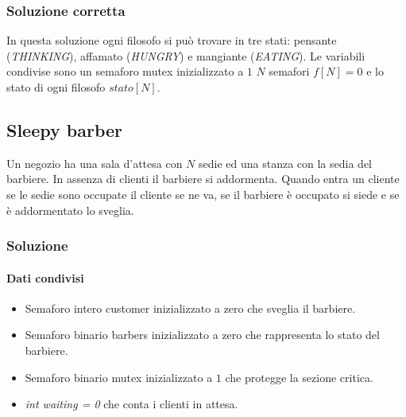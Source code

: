 \subsubsection{Soluzione corretta}
In questa soluzione ogni filosofo si pu\`o trovare in tre stati: pensante (\emph{THINKING}), affamato (\emph{HUNGRY}) e  mangiante (\emph{EATING}). Le variabili condivise sono un 
semaforo mutex inizializzato a $1$ $N$ semafori $f[N] = 0$ e lo stato di ogni filosofo $stato[N]$. 
\begin{multicols}{2}
	
	
	\columnbreak	
	
	
\end{multicols}
\subsection{Sleepy barber}
Un negozio ha una sala d'attesa con $N$ sedie ed una stanza con la sedia del barbiere. In assenza di clienti il barbiere si addormenta. Quando entra un cliente se le sedie sono 
occupate il cliente se ne va, se il barbiere \`e occupato si siede e se \`e addormentato lo sveglia. 
\subsubsection{Soluzione}
\paragraph{Dati condivisi}
\begin{itemize}
	\item Semaforo intero customer inizializzato a zero che sveglia il barbiere.
	\item Semaforo binario barbers inizializzato a zero che rappresenta lo stato del barbiere.
	\item Semaforo binario mutex inizializzato a $1$ che protegge la sezione critica.
	\item \emph{int waiting = 0} che conta i clienti in attesa.
\end{itemize}
\begin{multicols}{2}
	
	\columnbreak
	
\end{multicols}
